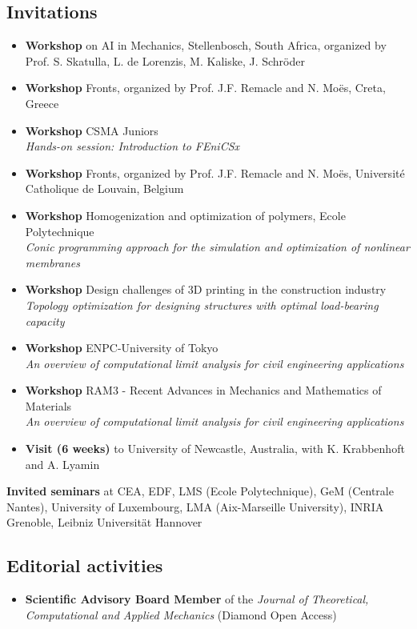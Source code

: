 \subsection*{\textcolor{navier_blue}{Invitations}}
\begin{itemize}[noitemsep]
\item[2026] \textbf{Workshop} on AI in Mechanics, Stellenbosch, South Africa, organized by Prof. S. Skatulla, L. de Lorenzis, M. Kaliske, J. Schröder
\item[2025] \textbf{Workshop} Fronts, organized by Prof. J.F. Remacle and N. Moës, Creta, Greece
\item[2023] \textbf{Workshop} CSMA Juniors\\
\textit{Hands-on session: Introduction to FEniCSx}
\item[2023] \textbf{Workshop} Fronts, organized by Prof. J.F. Remacle and N. Moës, Université Catholique de Louvain, Belgium
\item[2022] \textbf{Workshop} Homogenization and optimization of polymers, Ecole Polytechnique\\
\textit{Conic programming approach for the simulation and optimization
of nonlinear membranes}
\item[2020] \textbf{Workshop} Design challenges of 3D printing in the construction industry\\
\textit{Topology optimization for designing structures with optimal load-bearing capacity}
\item[2020] \textbf{Workshop} ENPC-University of Tokyo\\
\textit{An overview of computational limit analysis for civil engineering applications}
\item[2019] \textbf{Workshop} RAM3 - Recent Advances in Mechanics and Mathematics of Materials\\
\textit{An overview of computational limit analysis for civil engineering applications}
\item[2015] \textbf{Visit (6 weeks)} to University of Newcastle, Australia, with K. Krabbenhoft and A. Lyamin
\end{itemize}

\textbf{Invited seminars} at CEA, EDF, LMS (Ecole Polytechnique), GeM (Centrale Nantes), University of Luxembourg, LMA (Aix-Marseille University), INRIA Grenoble, Leibniz Universität Hannover


\subsection*{\textcolor{navier_blue}{Editorial activities}}
\begin{itemize}[noitemsep]
\item[2026--] \textbf{Scientific Advisory Board Member} of the \textit{Journal of Theoretical, Computational and Applied Mechanics} (Diamond Open Access)
\end{itemize}

